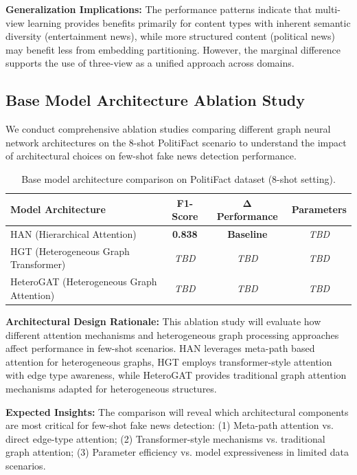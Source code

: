\textbf{Generalization Implications:} The performance patterns indicate that multi-view learning provides benefits primarily for content types with inherent semantic diversity (entertainment news), while more structured content (political news) may benefit less from embedding partitioning. However, the marginal difference supports the use of three-view as a unified approach across domains.

\subsection{Base Model Architecture Ablation Study}

We conduct comprehensive ablation studies comparing different graph neural network architectures on the 8-shot PolitiFact scenario to understand the impact of architectural choices on few-shot fake news detection performance.

\begin{table}[htbp]
\centering
\caption{Base model architecture comparison on PolitiFact dataset (8-shot setting).}
\label{tab:base_model_ablation}
\begin{tabular}{lccc}
\toprule
\textbf{Model Architecture} & \textbf{F1-Score} & \textbf{Δ Performance} & \textbf{Parameters} \\
\midrule
HAN (Hierarchical Attention) & \textbf{0.838} & \textbf{Baseline} & \textit{TBD} \\
HGT (Heterogeneous Graph Transformer) & \textit{TBD} & \textit{TBD} & \textit{TBD} \\
HeteroGAT (Heterogeneous Graph Attention) & \textit{TBD} & \textit{TBD} & \textit{TBD} \\
\bottomrule
\end{tabular}
\end{table}

\textbf{Architectural Design Rationale:} This ablation study will evaluate how different attention mechanisms and heterogeneous graph processing approaches affect performance in few-shot scenarios. HAN leverages meta-path based attention for heterogeneous graphs, HGT employs transformer-style attention with edge type awareness, while HeteroGAT provides traditional graph attention mechanisms adapted for heterogeneous structures.

\textbf{Expected Insights:} The comparison will reveal which architectural components are most critical for few-shot fake news detection: (1) Meta-path attention vs. direct edge-type attention; (2) Transformer-style mechanisms vs. traditional graph attention; (3) Parameter efficiency vs. model expressiveness in limited data scenarios.

